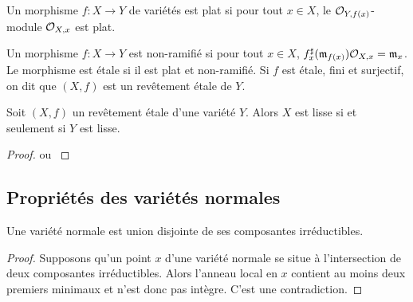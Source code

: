\begin{defn}
Un morphisme $f:X\rightarrow Y$ de variétés est plat si pour tout $x\in X$, le $\mathcal{O}_{Y,f(x)}$-module $\mathcal{O}_{X,x}$ est plat.
\end{defn}


\begin{defn}
Un morphisme $f:X\rightarrow Y$ est non-ramifié si pour tout $x\in X$, $f^\sharp_x(\mathfrak{m}_{f(x)})\mathcal{O}_{X,x}=\mathfrak{m}_x$. Le morphisme est étale si il est plat et non-ramifié. Si $f$ est étale, fini et surjectif, on dit  que $(X,f)$ est un revêtement étale de $Y$.
\end{defn}


\begin{prop}\label{EtaleLisse}
Soit $(X,f)$ un revêtement étale d'une variété $Y$. Alors $X$ est lisse si et seulement si $Y$ est lisse.
\end{prop}
\begin{proof}
\cite[IV.17.3.5]{EGA} ou \cite[ex III.10.4]{Hartshorne}
\end{proof}

\subsection{Propriétés des variétés normales}

\begin{prop}\label{normaluniondisjointe}
Une variété normale est union disjointe de ses composantes irréductibles.
\end{prop}
\begin{proof}
Supposons qu'un point $x$ d'une variété normale se situe à l'intersection de deux composantes irréductibles. Alors l'anneau local en $x$ contient au moins deux premiers minimaux et n'est donc pas intègre. C'est une contradiction.
\end{proof}

